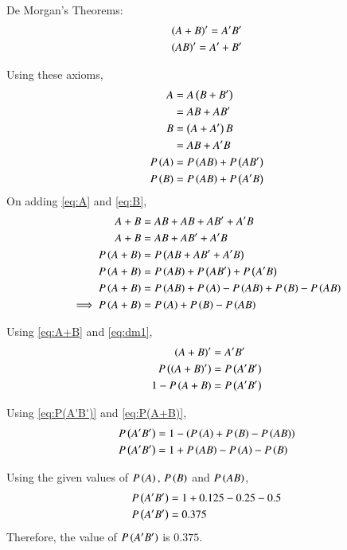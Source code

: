 \documentclass[journal]{IEEEtran}
\begin{document}
De Morgan's Theorems:
\begin{align}
    \left(A + B\right)^\prime  = A^\prime  B^\prime  \label{eq:dm1} \\
    \left(AB\right)^\prime  = A^\prime  + B^\prime  \label{eq:dm2}
\end{align}

Using these axioms,
\begin{align}
    A &= A\left(B + B^\prime \right) \\
    &= AB + AB^\prime  \label{eq:A}\\
    B &=\left(A+A^\prime \right)B \\
    &= AB + A^\prime  B \label{eq:B}\\
    P\left(A\right) &= P\left(AB\right) + P\left(AB^\prime \right)\\
    P\left(B\right) &= P\left(AB\right) + P\left(A^\prime  B\right)
\end{align}
On adding \eqref{eq:A} and \eqref{eq:B},
\begin{align}
    A + B &= AB + AB + AB^\prime  + A^\prime  B\\
    A + B &= AB + AB^\prime  + A^\prime  B \label{eq:A+B}\\
    P\left(A + B\right) &= P\left(AB + AB^\prime  + A^\prime  B\right)\\
    P\left(A + B\right) &= P\left(AB\right) + P\left(AB^\prime \right) + P\left(A^\prime  B\right)\\
    P\left(A + B\right) &= P\left(AB\right) + P\left(A\right) - P\left(AB\right) + P\left(B\right) - P\left(AB\right)\\
    \implies P\left(A + B\right) &= P\left(A\right) + P\left(B\right) - P\left(AB\right) \label{eq:P(A+B)}
\end{align}

Using \eqref{eq:A+B} and \eqref{eq:dm1},
\begin{align}
    \left(A+B\right)^\prime  &= A^\prime B^\prime  \\
    P\left(\left(A+B\right)^\prime \right) &= P\left(A^\prime B^\prime \right) \\
    1 - P\left(A+B\right) &= P\left(A^\prime B^\prime \right) \label{eq:P(A'B')}
\end{align}

Using \eqref{eq:P(A'B')} and \eqref{eq:P(A+B)},
\begin{align}
    P\left(A^\prime B^\prime \right) &= 1 - \left(P\left(A\right) + P\left(B\right) - P\left(AB\right)\right) \\
    P\left(A^\prime B^\prime \right) &= 1 + P\left(AB\right) - P\left(A\right) - P\left(B\right)
\end{align}

Using the given values of $P\left(A\right),\,P\left(B\right)$ and $P\left(AB\right)$,
\begin{align}
    P\left(A^\prime B^\prime \right) &= 1 + 0.125 - 0.25 - 0.5 \\
    P\left(A^\prime B^\prime \right) &= 0.375
\end{align}
Therefore, the value of $P\left(A^\prime B^\prime \right)$ is $0.375$.
\end{document}
